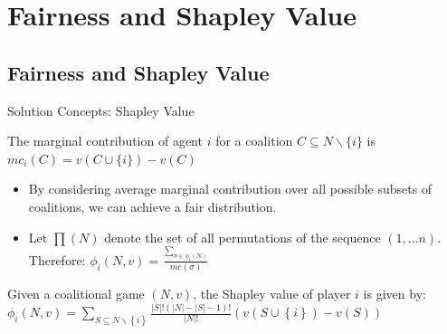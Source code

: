 \documentclass{beamer}
\begin{document}
\section{Fairness and Shapley Value}
\subsection{Fairness and Shapley Value}
\begin{frame}{Solution Concepts: Shapley Value}
    \begin{definition} \label{dfn:marginalcontribution}
        The {\color{blue}marginal contribution} of agent $i$ for a coalition $C \subseteq N \backslash \{i\}$ is $mc_i(C) = v(C \cup \{i\}) - v(C)$
    \end{definition}

    \begin{itemize}
        \item By considering average marginal contribution over all possible subsets of coalitions, we can achieve a fair distribution.\\
        \item Let $\prod(N)$ denote the set of all permutations of the sequence $(1,...n)$. Therefore: $\phi_i(N,v) = \frac{\sum_{\sigma \in \phi_i(N)}}{mc(\sigma)}$
    \end{itemize}

    \begin{definition} \label{dfn:shapleyvalue}
        Given a coalitional game $(N,v)$, the Shapley value of player $i$ is given by: \\
        $\phi_i(N,v) = \sum_{S \subseteq N \backslash \left\{i\right\} } \frac{|S|! (|N|-|S|-1)!}{|N|!} (v(S \cup \left\{i\right\}) - v(S))$
    \end{definition}
\end{frame}
\end{document}
